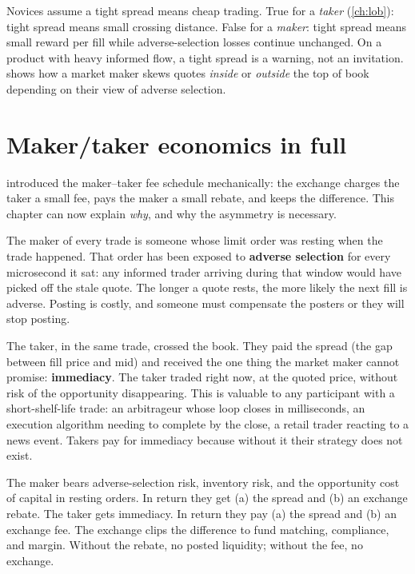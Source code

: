 \begin{pitfallbox}[``Small spread = cheap trading cost'' is wrong for makers]
Novices assume a tight spread means cheap trading. True for a
\emph{taker} (\cref{ch:lob}): tight spread means small crossing
distance. False for a \emph{maker}: tight spread means small reward
per fill while adverse-selection losses continue unchanged. On a
product with heavy informed flow, a tight spread is a warning, not an
invitation.  shows how a market maker skews
quotes \emph{inside} or \emph{outside} the top of book depending on
their view of adverse selection.
\end{pitfallbox}

\section{Maker/taker economics in full}
\label{sec:maker_taker_econ}

 introduced the maker--taker fee schedule mechanically:
the exchange charges the taker a small fee, pays the maker a small
rebate, and keeps the difference. This chapter can now explain
\emph{why}, and why the asymmetry is necessary.

The maker of every trade is someone whose limit order was resting when
the trade happened. That order has been exposed to \textbf{adverse
selection} for every microsecond it sat: any informed trader arriving
during that window would have picked off the stale quote. The longer a
quote rests, the more likely the next fill is adverse. Posting is
costly, and someone must compensate the posters or they will stop
posting.

The taker, in the same trade, crossed the book. They paid the spread
(the gap between fill price and mid) and received the one thing
the market maker cannot promise: \textbf{immediacy}. The taker traded
right now, at the quoted price, without risk of the opportunity
disappearing. This is valuable to any participant with a
short-shelf-life trade: an arbitrageur whose loop closes in
milliseconds, an execution algorithm needing to complete by the close,
a retail trader reacting to a news event. Takers pay for immediacy
because without it their strategy does not exist.

\begin{keyfactbox}
The maker bears adverse-selection risk, inventory risk, and the
opportunity cost of capital in resting orders. In return they get (a)
the spread and (b) an exchange rebate. The taker gets immediacy. In
return they pay (a) the spread and (b) an exchange fee. The exchange
clips the difference to fund matching, compliance, and margin.
Without the rebate, no posted liquidity; without the fee, no
exchange.
\end{keyfactbox}

